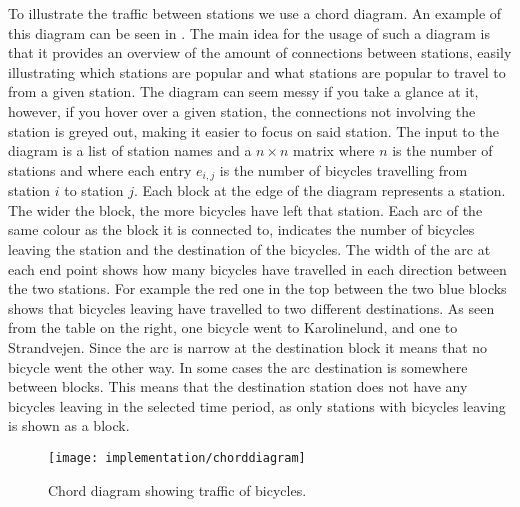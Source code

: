 To illustrate the traffic between stations we use a chord diagram. 
An example of this diagram can be seen in .
The main idea for the usage of such a diagram is that it provides an overview of the amount of connections between stations, easily illustrating which stations are popular and what stations are popular to travel to from a given station.
The diagram can seem messy if you take a glance at it, however, if you hover over a given station, the connections not involving the station is greyed out, making it easier to focus on said station.
The input to the diagram is a list of station names and a $n \times n$ matrix where $n$ is the number of stations and where each entry $e_{i,j}$ is the number of bicycles travelling from station $i$ to station $j$. 
Each block at the edge of the diagram represents a station. 
The wider the block, the more bicycles have left that station. 
Each arc of the same colour as the block it is connected to, indicates the number of bicycles leaving the station and the destination of the bicycles. 
The width of the arc at each end point shows how many bicycles have travelled in each direction between the two stations. 
For example the red one in the top between the two blue blocks shows that bicycles leaving have travelled to two different destinations. 
As seen from the table on the right, one bicycle went to Karolinelund, and one to Strandvejen. 
Since the arc is narrow at the destination block it means that no bicycle went the other way. 
In some cases the arc destination is somewhere between blocks. 
This means that the destination station does not have any bicycles leaving in the selected time period, as only stations with bicycles leaving is shown as a block.

\begin{figure}[h]
\texttt{[image: implementation/chorddiagram]}
\caption{Chord diagram showing traffic of bicycles.}\label{fig:chorddiagram}
\end{figure}

